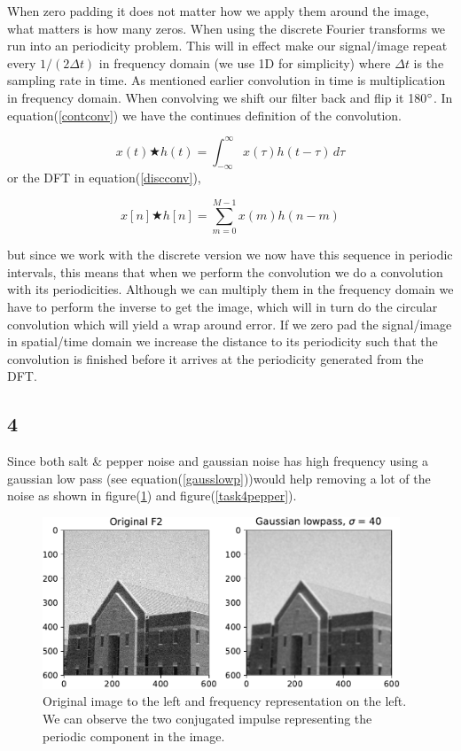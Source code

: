 {When zero padding it does not matter how we apply them around the image, what matters is how many zeros. When using the discrete Fourier transforms we run into an periodicity problem. This will in effect make our signal/image repeat every $1/(2\Delta t)$ in frequency domain (we use 1D for simplicity) where $\Delta t$ is the sampling rate in time. As mentioned earlier convolution in time is multiplication in frequency domain. When convolving we shift our filter back and flip it 180$\degree$. In equation(\ref{contconv}) we have the continues definition of the convolution.

\begin{equation}
    x(t) \bigstar h(t) = \int_{-\infty}^{\infty} x(\tau)h(t - \tau)\, d\tau
    \label{contconv}
\end{equation}
or the DFT in equation(\ref{discconv}),

\begin{equation}
    x[n] \bigstar h[n] = \sum_{m = 0}^{M-1} x(m)h(n - m)
    \label{discconv}
\end{equation}

but since we work with the discrete version we now have this sequence in periodic intervals, this means that when we perform the convolution we do a convolution with its periodicities. Although we can multiply them in the frequency domain we have to perform the inverse to get the image, which will in turn do the circular convolution which will yield a wrap around error. If we zero pad the signal/image in spatial/time domain we increase the distance to its periodicity such that the convolution is finished before it arrives at the periodicity generated from the DFT.


\subsection{4}

Since both salt \& pepper noise and gaussian noise has high frequency using a gaussian low pass (see equation(\ref{gausslowp}))would help removing a lot of the noise as shown in figure(\ref{task4gauss}) and figure(\ref{task4pepper}).

\begin{figure}[!htb]
    {\centering
        \includegraphics[width=0.95\textwidth]{C42.pdf}
        \caption{Original image to the left and frequency representation on the left. We can observe the two conjugated impulse representing the periodic component in the image.}
        \label{task4gauss}
    \par}
    \end{figure}

}

